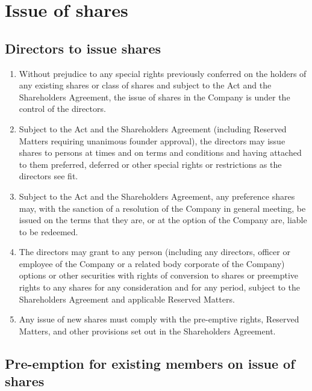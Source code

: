 \section{Issue of shares}

\subsection{Directors to issue shares}

\begin{enumerate}[label=(\alph*)]
    \item Without prejudice to any special rights previously conferred on the holders of any existing shares or class of shares and subject to the Act and the Shareholders Agreement, the issue of shares in the Company is under the control of the directors.
    
    \item Subject to the Act and the Shareholders Agreement (including Reserved Matters requiring unanimous founder approval), the directors may issue shares to persons at times and on terms and conditions and having attached to them preferred, deferred or other special rights or restrictions as the directors see fit.
    
    \item Subject to the Act and the Shareholders Agreement, any preference shares may, with the sanction of a resolution of the Company in general meeting, be issued on the terms that they are, or at the option of the Company are, liable to be redeemed.
    
    \item The directors may grant to any person (including any directors, officer or employee of the Company or a related body corporate of the Company) options or other securities with rights of conversion to shares or preemptive rights to any shares for any consideration and for any period, subject to the Shareholders Agreement and applicable Reserved Matters.
    
    \item Any issue of new shares must comply with the pre-emptive rights, Reserved Matters, and other provisions set out in the Shareholders Agreement.
\end{enumerate}

\subsection{Pre-emption for existing members on issue of shares}


